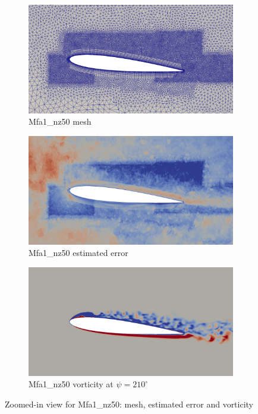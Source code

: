 \begin{figure}[H]
	\centering
	\begin{subfigure}[b]{0.7\textwidth}
		\centering
		\includegraphics[width=1\textwidth]{figures/adapt_strat/zoomed/Mfa1_mesh.png}
		\caption{Mfa1\_nz50 mesh}
		\label{fig:Mfa1_mesh_zoomed}
	\end{subfigure}
	\begin{subfigure}[b]{0.7\textwidth}
		\centering
		\includegraphics[width=1\textwidth]{figures/adapt_strat/zoomed/Mfa1_error.png}
		\caption{Mfa1\_nz50 estimated error}
		\label{fig:Mfa1_max_error_zoomed}
	\end{subfigure}
	\begin{subfigure}[b]{0.7\textwidth}
		\centering
		\includegraphics[width=1\textwidth]{figures/adapt_strat/zoomed/Mfa1_ph_210.png}
		\caption{Mfa1\_nz50 vorticity at $\psi=210^\circ$}
		\label{fig:Mfa1_vorticity_zoomed}
	\end{subfigure}
	\caption{Zoomed-in view for Mfa1\_nz50: mesh, estimated error and vorticity}
	\label{fig:Mfa1_zoomed}
\end{figure}




